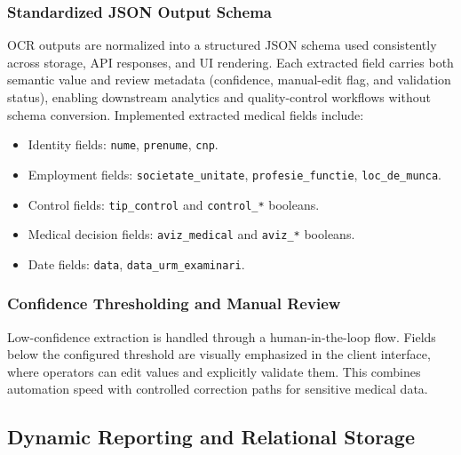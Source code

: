 \documentclass[12pt,a4paper]{article}
\begin{document}
    \subsubsection{Standardized JSON Output Schema}
    OCR outputs are normalized into a structured JSON schema used consistently
    across storage, API responses, and UI rendering. Each extracted field
    carries both semantic value and review metadata (confidence, manual-edit
    flag, and validation status), enabling downstream analytics and
    quality-control workflows without schema conversion.
    Implemented extracted medical fields include:
    \begin{itemize}[leftmargin=*]
        \item Identity fields: \texttt{nume}, \texttt{prenume}, \texttt{cnp}.
        \item Employment fields: \texttt{societate\_unitate},
        \texttt{profesie\_functie}, \texttt{loc\_de\_munca}.
        \item Control fields: \texttt{tip\_control} and
        \texttt{control\_*} booleans.
        \item Medical decision fields: \texttt{aviz\_medical} and
        \texttt{aviz\_*} booleans.
        \item Date fields: \texttt{data}, \texttt{data\_urm\_examinari}.
    \end{itemize}

    \subsubsection{Confidence Thresholding and Manual Review}
    Low-confidence extraction is handled through a human-in-the-loop flow.
    Fields below the configured threshold are visually emphasized in the client
    interface, where operators can edit values and explicitly validate them.
    This combines automation speed with controlled correction paths for
    sensitive medical data.

\subsection{Dynamic Reporting and Relational Storage}
\end{document}
